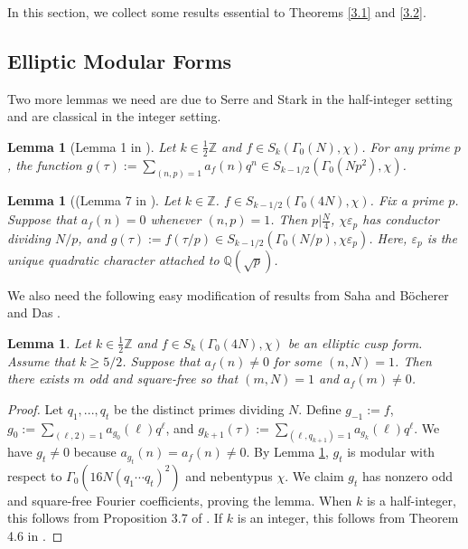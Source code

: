 \documentclass[11pt]{article}
\newtheorem{lemma}[theorem]{Lemma}
\theoremstyle{definition}
\theoremstyle{remark}
\newcommand{\Z}{\mathbb{Z}}
\begin{document}
In this section, we collect some results essential to Theorems \ref{3.1} and \ref{3.2}. 

\subsection{Elliptic Modular Forms}

Two more lemmas we need are due to Serre and Stark \cite{SS} in the half-integer setting and are classical in the integer setting. \\

\begin{lemma}[Lemma 1 in \cite{Yamana}] \label{4.4}
    Let $k \in \frac{1}{2}\Z$ and $f \in S_{k}(\Gamma_0(N),\chi)$. For any prime $p$, the function $\displaystyle g(\tau) := \sum_{(n,p) = 1} a_f(n) q^n \in S_{k-1/2}(\Gamma_0(Np^2),\chi)$. 
\end{lemma} 

\begin{lemma}[(Lemma 7 in \cite{SS}] \label{4.5}
    Let $k \in \Z$. $f \in S_{k-1/2}(\Gamma_0(4N),\chi)$. Fix a prime $p$. Suppose that $a_f(n) = 0$ whenever $(n,p) = 1$. Then $p \vert \frac{N}{4}$, $\chi \varepsilon_p$ has conductor dividing $N/p$, and $g(\tau) := f(\tau/p) \in S_{k-1/2}(\Gamma_0(N/p), \chi \varepsilon_p)$. Here, $\varepsilon_p$ is the unique quadratic character attached to $\mathbb{Q}(\sqrt{p})$.\\
\end{lemma}

We also need the following easy modification of results from Saha \cite{Saha} and B\"ocherer and Das \cite{BD}. \\

\begin{lemma} \label{4.2}
    Let $k \in \frac{1}{2}\Z$ and $f \in S_{k}(\Gamma_0(4N),\chi)$ be an elliptic cusp form. Assume that $k \geq 5/2$. Suppose that $a_f(n) \neq 0$ for some $(n,N) = 1$. Then there exists $m$ odd and square-free so that $(m,N) = 1$ and $a_f(m) \neq 0$. 
\end{lemma}

\begin{proof}

Let $q_1,...,q_t$ be the distinct primes dividing $N$. Define $g_{-1} := f$, $\displaystyle g_0 := \sum_{(\ell,2) = 1} a_{g_0}(\ell) q^\ell$, and $\displaystyle g_{k+1}(\tau) := \sum_{(\ell, q_{k+1})=1} a_{g_k}(\ell) q^\ell$. We have $g_t \neq 0$ because $a_{g_t}(n) =a_f(n) \neq 0$. By Lemma \ref{4.4}, $g_t$ is modular with respect to $\Gamma_0(16N(q_1 \cdots q_t)^2)$ and nebentypus $\chi$. We claim $g_t$ has nonzero odd and square-free Fourier coefficients, proving the lemma. When $k$ is a half-integer, this follows from Proposition 3.7 of \cite{Saha}. If $k$ is an integer, this follows from Theorem 4.6 in \cite{BD}. 

\end{proof}
\end{document}

